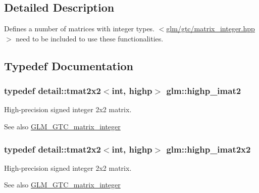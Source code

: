 \subsection{Detailed Description}
Defines a number of matrices with integer types. $<$\hyperlink{matrix__integer_8hpp}{glm/gtc/matrix\+\_\+integer.\+hpp}$>$ need to be included to use these functionalities. 

\subsection{Typedef Documentation}
\subsubsection[{\texorpdfstring{highp\+\_\+imat2}{highp_imat2}}]{\setlength{\rightskip}{0pt plus 5cm}typedef detail\+::tmat2x2$<$int, highp$>$ {\bf glm\+::highp\+\_\+imat2}}\hypertarget{group__gtc__matrix__integer_ga70eae282157f23589db24f4664bbf956}{}\label{group__gtc__matrix__integer_ga70eae282157f23589db24f4664bbf956}
High-\/precision signed integer 2x2 matrix. \begin{DoxySeeAlso}{See also}
\hyperlink{group__gtc__matrix__integer}{G\+L\+M\+\_\+\+G\+T\+C\+\_\+matrix\+\_\+integer} 
\end{DoxySeeAlso}
\subsubsection[{\texorpdfstring{highp\+\_\+imat2x2}{highp_imat2x2}}]{\setlength{\rightskip}{0pt plus 5cm}typedef detail\+::tmat2x2$<$int, highp$>$ {\bf glm\+::highp\+\_\+imat2x2}}\hypertarget{group__gtc__matrix__integer_ga9646ff5ef973234755e63e727c5a37fc}{}\label{group__gtc__matrix__integer_ga9646ff5ef973234755e63e727c5a37fc}
High-\/precision signed integer 2x2 matrix. \begin{DoxySeeAlso}{See also}
\hyperlink{group__gtc__matrix__integer}{G\+L\+M\+\_\+\+G\+T\+C\+\_\+matrix\+\_\+integer} 
\end{DoxySeeAlso}
